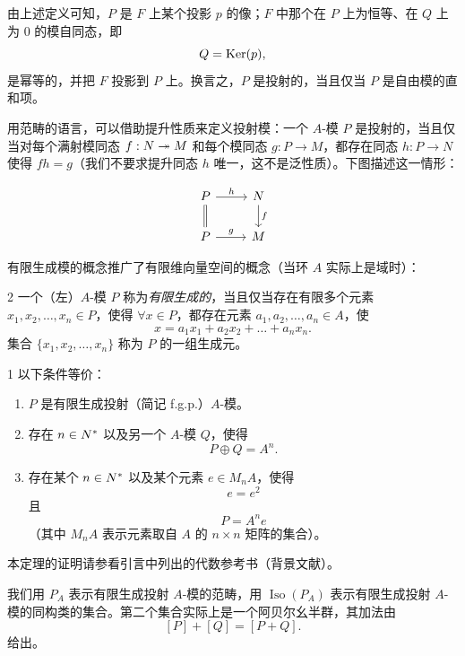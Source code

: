 由上述定义可知，$P$ 是 $F$ 上某个投影 $p$ 的像；$F$ 中那个在 $P$ 上为恒等、在 $Q$ 上为 $0$ 的模自同态，即
\[ Q = \operatorname{Ker}(p), \]
是幂等的，并把 $F$ 投影到 $P$ 上。换言之，$P$ 是投射的，当且仅当 $P$ 是自由模的直和项。

用范畴的语言，可以借助提升性质来定义投射模：一个 $A$-模 $P$ 是投射的，当且仅当对每个满射模同态 $f : N \twoheadrightarrow M$ 和每个模同态 $g : P \to M$，都存在同态 $h : P \to N$ 使得 $fh = g$（我们不要求提升同态 $h$ 唯一，这不是泛性质）。下图描述这一情形：

\[
\begin{tikzcd}
P \arrow[r,"h"] \arrow[d,equal] & N \arrow[d,"f"] \\
P \arrow[r,"g"] & M
\end{tikzcd}
\]

有限生成模的概念推广了有限维向量空间的概念（当环 $A$ 实际上是域时）：

\begin{defn}{2} 一个（左）$A$-模 $P$ 称为\emph{有限生成的}，当且仅当存在有限多个元素 $x_1, x_2, \dots, x_n \in P$，使得 $\forall x \in P$，都存在元素 $a_1, a_2, \dots, a_n \in A$，使
\[ x = a_1x_1 + a_2x_2 + \dots + a_nx_n. \]
集合 $\{x_1, x_2, \dots, x_n\}$ 称为 $P$ 的一组生成元。\end{defn}

\begin{thm}{1} 以下条件等价：
\begin{enumerate}[label=\arabic*.]
\item $P$ 是有限生成投射（简记 f.g.p.）$A$-模。
\item 存在 $n \in N^*$ 以及另一个 $A$-模 $Q$，使得
\[ P \oplus Q = A^n. \]
\item 存在某个 $n \in N^*$ 以及某个元素 $e \in M_nA$，使得
\[ e = e^2 \]
且
\[ P = A^n e \]
（其中 $M_nA$ 表示元素取自 $A$ 的 $n \times n$ 矩阵的集合）。
\end{enumerate}
\end{thm}

本定理的证明请参看引言中列出的代数参考书（背景文献）。

我们用 $P_A$ 表示有限生成投射 $A$-模的范畴，用 $\operatorname{Iso}(P_A)$ 表示有限生成投射 $A$-模的同构类的集合。第二个集合实际上是一个阿贝尔幺半群，其加法由
\[ [P] + [Q] = [P + Q]. \]
给出。

